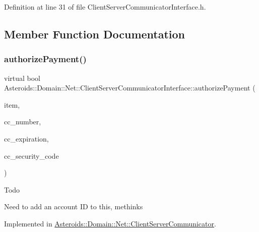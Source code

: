 Definition at line 31 of file Client\+Server\+Communicator\+Interface.\+h.



\subsection{Member Function Documentation}
\mbox{\label{classAsteroids_1_1Domain_1_1Net_1_1ClientServerCommunicatorInterface_a02e01e493689e98bf44aa9a40feee063}} 
\subsubsection{\texorpdfstring{authorize\+Payment()}{authorizePayment()}}
{\footnotesize\ttfamily virtual bool Asteroids\+::\+Domain\+::\+Net\+::\+Client\+Server\+Communicator\+Interface\+::authorize\+Payment (\begin{DoxyParamCaption}\item[{std\+::shared\+\_\+ptr$<$ \hyperlink{classAsteroids_1_1Domain_1_1Store_1_1STORE__ITEM__INTERFACE}{Asteroids\+::\+Domain\+::\+Store\+::\+S\+T\+O\+R\+E\+\_\+\+I\+T\+E\+M\+\_\+\+I\+N\+T\+E\+R\+F\+A\+CE} $>$}]{item,  }\item[{std\+::string}]{cc\+\_\+number,  }\item[{std\+::string}]{cc\+\_\+expiration,  }\item[{std\+::string}]{cc\+\_\+security\+\_\+code }\end{DoxyParamCaption})\hspace{0.3cm}{\ttfamily [pure virtual]}}

\begin{DoxyRefDesc}{Todo}
\item[\hyperlink{todo__todo000007}{Todo}]Need to add an account ID to this, methinks \end{DoxyRefDesc}


Implemented in \hyperlink{classAsteroids_1_1Domain_1_1Net_1_1ClientServerCommunicator_abf768675ef72169877377e923510e9a5}{Asteroids\+::\+Domain\+::\+Net\+::\+Client\+Server\+Communicator}.

